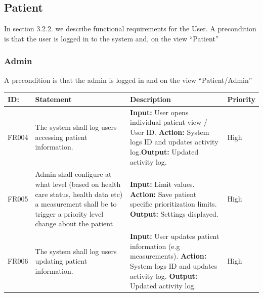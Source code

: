\documentclass{scrreprt}
\begin{document}
\subsection{Patient}
In section 3.2.2. we describe functional requirements for the User. A precondition is that the user is logged in to the system and, on the view “Patient”
\subsubsection{Admin}
A precondition is that the admin is logged in and on the view “Patient/Admin” 
\begin{center}
\begin{tabularx}{\linewidth}{| l | X | X | l |}
\hline
\textbf{ID:} & \textbf{Statement} & \textbf{Description} & \textbf{Priority} \\ 
\hline
FR004 & The system shall log users accessing patient information. & \textbf{Input:} User opens individual patient view / User ID.
\newline \textbf{Action:} System logs ID and updates activity log.\newline \textbf{Output:} Updated activity log. & High \\ 
\hline
FR005 & Admin shall configure at what level (based on health care status, health data etc) a measurement shall be to trigger a priority level change about the patient & \textbf{Input:} Limit values.
\newline \textbf{Action:} Save patient specific prioritization limits.
\newline \textbf{Output:} Settings displayed. &  High \\ 
\hline
FR006 & The system shall log users updating patient information. & \textbf{Input:} User updates patient information (e.g measurements).
\newline \textbf{Action:} System logs ID and updates activity log.
\newline \textbf{Output:} Updated activity log. & High \\ 
\hline
\end{tabularx}
\end{center}
\end{document}

